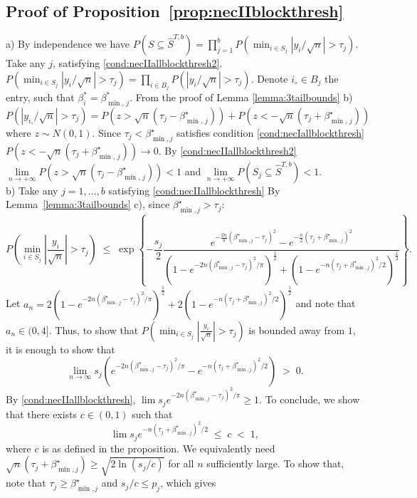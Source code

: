 \documentclass[aos]{imsart}
\theoremstyle{plain}
\begin{document}
\subsection{Proof of Proposition~\ref{prop:necIIblockthresh}} 
a) By independence we have 
$P(S \subseteq \hat{S}^{T,b})=\prod_{j=1}^b P(\min_{i \in S_j}|y_i/\sqrt{n}| > \tau_j)$. Take any $j$, satisfying \eqref{cond:necIIallblockthresh2}. $P(\min_{i \in S_j}|y_i/\sqrt{n}| > \tau_j)=\prod_{i \in B_j} P(|y_i/\sqrt{n}| > \tau_j)$. Denote $i_{\circ}\in B_j$ the entry, such that $\beta_i^*=\beta^*_{\min,\,j}$. From the proof of Lemma \ref{lemma:3tailbounds} b) $$P(|y_{i_{\circ}}/\sqrt{n}|>\tau_j) 
    = P\left(z>\sqrt{n}\left(\tau_j-\beta_{\min,\,j}^{\star}\right)\right) + P\left(z<-\sqrt{n}\left(\tau_j+\beta_{\min,\,j}^{\star}\right)\right)$$ where $z\sim N(0,1)$. Since $\tau_j<\beta^\star_{\min,j}$ satisfies condition \eqref{cond:necIallblockthresh} $P(z<-\sqrt{n}\left(\tau_j+\beta_{\min,\,j}^{\star}\right)) \to 0$. By \eqref{cond:necIIallblockthresh2} $\underset{n \to +\infty}{\lim}P\left(z>\sqrt{n}\left(\tau_j-\beta_{\min,\,j}^{\star}\right)\right)<1$ and $\underset{n \to +\infty}{\lim}P\left(S_j \subseteq \hat{S}^{T,b} \right)<1$.\\
b)	Take any $j=1,\ldots,b$ satisfying \eqref{cond:necIIallblockthresh} By Lemma~\ref{lemma:3tailbounds} c), since $\beta^\star_{\min,j}>\tau_j$:
$$P\left(\min_{i \in S_j}|\frac{y_i}{\sqrt{n}}| > \tau_j \right)\;\leq\;\exp\left\{-\frac{s_j}{2}\frac{e^{-\tfrac{2n}{\pi}(\beta^\star_{\min,j}-\tau_j)^2}-e^{-\tfrac{n}{2}(\tau_j+\beta^\star_{\min,j})^2}}{\left(1-e^{-2n(\beta^\star_{\min,j}-\tau_j)^2/\pi}\right)^{\frac{1}{2}}+\left(1-e^{-n(\tau_j+\beta^\star_{\min,j})^2/2}\right)^{\frac{1}{2}}}\right\}. $$
Let $a_{n}=2\left(1-e^{-2n(\beta^\star_{\min,j}-\tau_j)^2/\pi}\right)^{\frac{1}{2}}+2\left(1-e^{-n(\tau_j+\beta^\star_{\min,j})^2/2}\right)^{\frac{1}{2}}$ and note that $a_n\in (0, 4]$.  Thus, to show that $P\left(\min_{i \in S_j}|\tfrac{y_i}{\sqrt{n}}| > \tau_j \right)$ is bounded away from $1$, it is enough to show that 
$$
\lim_{n\to \infty}{s_j}({e^{-2n(\beta^\star_{\min,j}-\tau_j)^2/\pi}-e^{-n(\tau_j+\beta^\star_{\min,j})^2/2}})\;>\;0.
$$
By \eqref{cond:necIIallblockthresh}, $\lim {s_j} e^{-2n(\beta^\star_{\min,j}-\tau_j)^2/\pi}\geq 1$. To conclude, we show that there exists $c\in(0,1)$ such that
$$
\lim {s_j} e^{-n(\tau_j+\beta^\star_{\min,j})^2/2}\;\leq\;c\;<\;1,
$$ 
where $c$ is as defined in the proposition. We equivalently need
$\sqrt{n}(\tau_j+\beta^\star_{\min,j})\geq\sqrt{{2\ln (s_j/c)}}$ for all $n$ sufficiently large. To show that, note that $\tau_j\geq \beta^\star_{\min,j}$ and $s_j/c\leq p_j$, which gives
\end{document}
